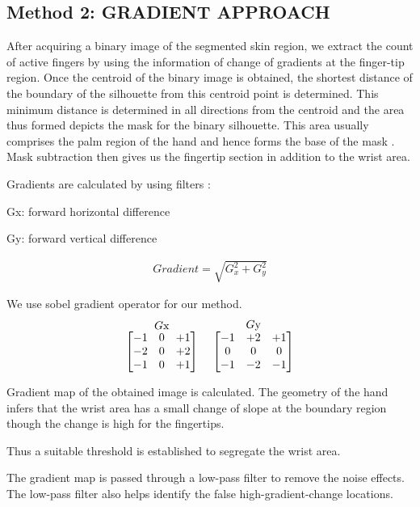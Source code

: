 \documentclass[conference]{IEEEtran}
\begin{document}
\subsection{Method 2: GRADIENT APPROACH}
After acquiring a binary image of the segmented skin region, we extract the count of active fingers by using the information of change of gradients at the finger-tip region.
Once the centroid of the binary image is obtained, the shortest distance of the boundary of the silhouette from this centroid point is determined. This minimum distance is determined in all directions from the centroid and the area thus formed depicts the mask for the binary silhouette. This area usually comprises the palm region of the hand and hence forms the base of the mask \cite{6481804}. Mask subtraction then gives us the fingertip section in addition to the wrist area.

Gradients are calculated by using filters :

Gx: forward horizontal difference 

Gy: forward vertical difference

\begin{equation}
\begin{aligned}
Gradient = \sqrt{G_x^2 + G_y^2}
\end{aligned}
\end{equation}


We use sobel gradient operator for our method.
\[
  \stackrel{\mbox{$G$x}}{%
    \begin{bmatrix}
    -1 & 0 & +1 \\
    -2 & 0 & +2 \\
    -1 & 0 & +1
    \end{bmatrix}%
  }\ \quad
  \stackrel{\mbox{$G$y}}{%
    \begin{bmatrix}
    -1 & +2 & +1 \\
    0 & 0 & 0 \\
    -1 & -2 & -1
    \end{bmatrix}%
  }
\]


Gradient map of the obtained image is calculated. The geometry of the hand infers that the wrist area has a small change of slope at the boundary region though the change is high for the fingertips.

Thus a suitable threshold is established to segregate the wrist area.

The gradient map is passed through a low-pass filter to remove the noise effects. The low-pass filter also helps identify the false high-gradient-change locations.
\end{document}
